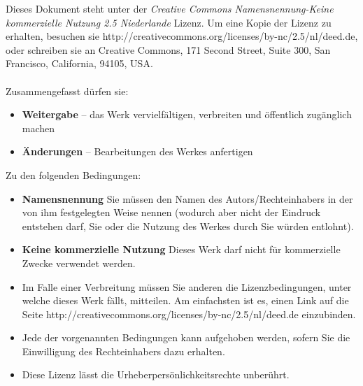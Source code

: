 \clearemptydoublepage
\noindent\thispagestyle{empty}
Dieses Dokument steht unter der \emph{Creative Commons Namensnennung-Keine kommerzielle Nutzung 2.5 Niederlande} Lizenz. Um eine Kopie der Lizenz zu erhalten, besuchen sie http://creativecommons.org/licenses/by-nc/2.5/nl/deed.de, oder schreiben sie an Creative Commons, 171 Second Street, Suite 300, San Francisco, California, 94105, USA.\\\\
Zusammengefasst dürfen sie:
  \begin{itemize}
    \item \textbf{Weitergabe} -- das Werk vervielfältigen, verbreiten und öffentlich zugänglich machen
    \item \textbf{Änderungen} -- Bearbeitungen des Werkes anfertigen
  \end{itemize}
  Zu den folgenden Bedingungen:
  \begin{itemize}
    \item \textbf{Namensnennung} Sie müssen den Namen des Autors/Rechteinhabers in der von ihm festgelegten Weise nennen (wodurch aber nicht der Eindruck entstehen darf, Sie oder die Nutzung des Werkes durch Sie würden entlohnt).
    \item \textbf{Keine kommerzielle Nutzung} Dieses Werk darf nicht für kommerzielle Zwecke verwendet werden.
    \item Im Falle einer Verbreitung müssen Sie anderen die Lizenzbedingungen, unter welche dieses Werk fällt, mitteilen. Am einfachsten ist es, einen Link auf die Seite http://creativecommons.org/licenses/by-nc/2.5/nl/deed.de einzubinden.
    \item Jede der vorgenannten Bedingungen kann aufgehoben werden, sofern Sie die Einwilligung des Rechteinhabers dazu erhalten.
    \item Diese Lizenz lässt die Urheberpersönlichkeitsrechte unberührt.
  \end{itemize}
\normalsize


\clearemptydoublepage
